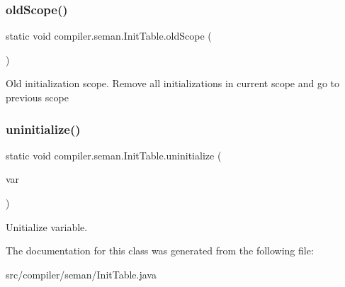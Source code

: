 \subsubsection{\texorpdfstring{old\+Scope()}{oldScope()}}
{\footnotesize\ttfamily static void compiler.\+seman.\+Init\+Table.\+old\+Scope (\begin{DoxyParamCaption}{ }\end{DoxyParamCaption})\hspace{0.3cm}{\ttfamily [static]}}

Old initialization scope. Remove all initializations in current scope and go to previous scope \mbox{\label{classcompiler_1_1seman_1_1_init_table_a77136e3337120c94621ca98e211672e0}} 
\subsubsection{\texorpdfstring{uninitialize()}{uninitialize()}}
{\footnotesize\ttfamily static void compiler.\+seman.\+Init\+Table.\+uninitialize (\begin{DoxyParamCaption}\item[{\hyperlink{classcompiler_1_1abstr_1_1tree_1_1def_1_1_abs_def}{Abs\+Def}}]{var }\end{DoxyParamCaption})\hspace{0.3cm}{\ttfamily [static]}}

Unitialize variable. 

The documentation for this class was generated from the following file\+:\begin{DoxyCompactItemize}
\item 
src/compiler/seman/Init\+Table.\+java\end{DoxyCompactItemize}
